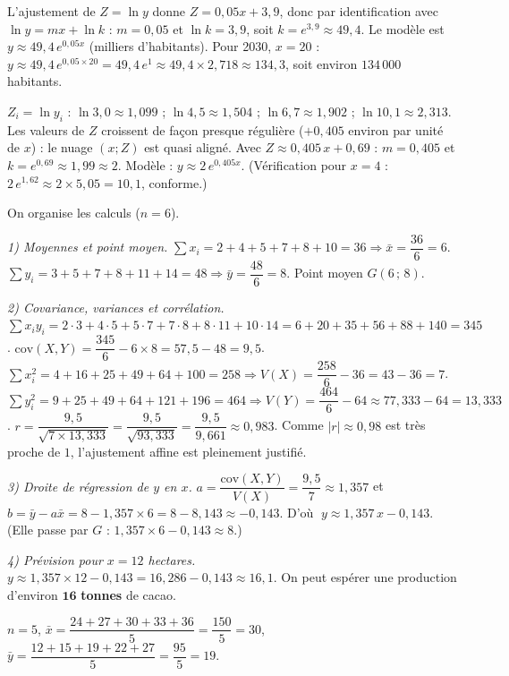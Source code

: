 L'ajustement de $Z=\ln y$ donne $Z=0{,}05x+3{,}9$, donc par identification avec
$\ln y=mx+\ln k$ : $m=0{,}05$ et $\ln k=3{,}9$, soit $k=e^{3{,}9}\approx49{,}4$.
Le modèle est $y\approx49{,}4\,e^{0{,}05x}$ (milliers d'habitants).
Pour 2030, $x=20$ : $y\approx49{,}4\,e^{0{,}05\times20}=49{,}4\,e^{1}\approx49{,}4\times2{,}718\approx134{,}3$,
soit environ $134\,000$ habitants.

$Z_i=\ln y_i$ : $\ln3{,}0\approx1{,}099$ ; $\ln4{,}5\approx1{,}504$ ; $\ln6{,}7\approx1{,}902$ ;
$\ln10{,}1\approx2{,}313$. Les valeurs de $Z$ croissent de façon presque régulière
($+0{,}405$ environ par unité de $x$) : le nuage $(x;Z)$ est quasi aligné.
Avec $Z\approx0{,}405\,x+0{,}69$ : $m=0{,}405$ et $k=e^{0{,}69}\approx1{,}99\approx2$.
Modèle : $y\approx2\,e^{0{,}405x}$. (Vérification pour $x=4$ :
$2\,e^{1{,}62}\approx2\times5{,}05=10{,}1$, conforme.)

On organise les calculs ($n=6$).
\smallskip

\noindent\textit{1) Moyennes et point moyen.}
$\sum x_i=2+4+5+7+8+10=36\Rightarrow\bar x=\dfrac{36}{6}=6$.\;
$\sum y_i=3+5+7+8+11+14=48\Rightarrow\bar y=\dfrac{48}{6}=8$.\;
Point moyen $G(6\,;\,8)$.
\smallskip

\noindent\textit{2) Covariance, variances et corrélation.}
$\sum x_iy_i=2\!\cdot\!3+4\!\cdot\!5+5\!\cdot\!7+7\!\cdot\!8+8\!\cdot\!11+10\!\cdot\!14
=6+20+35+56+88+140=345$.\;
$\mathrm{cov}(X,Y)=\dfrac{345}{6}-6\times8=57{,}5-48=9{,}5$.\;
$\sum x_i^2=4+16+25+49+64+100=258\Rightarrow V(X)=\dfrac{258}{6}-36=43-36=7$.\;
$\sum y_i^2=9+25+49+64+121+196=464\Rightarrow V(Y)=\dfrac{464}{6}-64\approx77{,}333-64=13{,}333$.\;
$r=\dfrac{9{,}5}{\sqrt{7\times13{,}333}}=\dfrac{9{,}5}{\sqrt{93{,}333}}=\dfrac{9{,}5}{9{,}661}\approx0{,}983$.
Comme $|r|\approx0{,}98$ est très proche de $1$, l'ajustement affine est pleinement justifié.
\smallskip

\noindent\textit{3) Droite de régression de $y$ en $x$.}
$a=\dfrac{\mathrm{cov}(X,Y)}{V(X)}=\dfrac{9{,}5}{7}\approx1{,}357$ et
$b=\bar y-a\bar x=8-1{,}357\times6=8-8{,}143\approx-0{,}143$.
D'où $\;y\approx1{,}357\,x-0{,}143$. (Elle passe par $G$ : $1{,}357\times6-0{,}143\approx8$.)
\smallskip

\noindent\textit{4) Prévision pour $x=12$ hectares.}
$y\approx1{,}357\times12-0{,}143=16{,}286-0{,}143\approx16{,}1$.
On peut espérer une production d'environ $\mathbf{16}$ \textbf{tonnes} de cacao.

$n=5$, $\bar x=\dfrac{24+27+30+33+36}{5}=\dfrac{150}{5}=30$,
$\bar y=\dfrac{12+15+19+22+27}{5}=\dfrac{95}{5}=19$.
\smallskip

